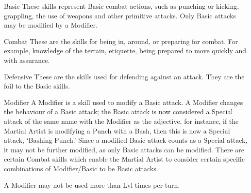\documentclass[twoside]{book}
\begin{document}
            
                Basic   These skills represent
                Basic combat actions, such as punching or kicking,
                grappling, the use of weapons and other primitive
                attacks.
               Only Basic attacks may be modified by a Modifier.
               
              
            
                Combat   These are the skills
                for being in, around, or preparing for combat. For
                example, knowledge of the terrain, etiquette, being
                prepared to move quickly and with assurance.
              
            
                Defensive   These are the
                skills used for defending against an attack. They are the
                foil to the Basic skills.
              
            
                Modifier   A Modifier is a
                skill used to modify a Basic attack. A Modifier changes
                the behaviour of a Basic attack; the Basic attack is now
                considered a Special attack of the same name with the
                Modifier as the adjective, for instance, if the Martial
                Artist is modifying a Punch with a Bash, then this is now
                a Special attack, `Bashing Punch.' Since a
                modified Basic attack counts as a Special attack, it may
                not be further modified, as only Basic attacks can be
                modified. There are certain Combat skills which enable
                the Martial Artist to consider certain specific
                combinations of Modifier/Basic to be Basic attacks.
              
           A Modifier may not be used more than Lvl times per
             turn. 
  
\end{document}
